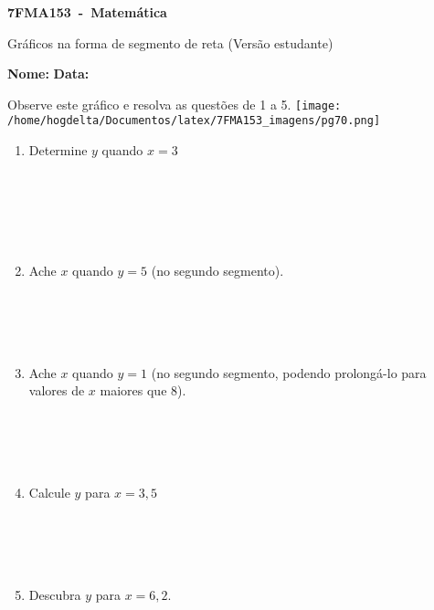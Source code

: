 \documentclass[a4paper,14pt]{article}
\begin{document}
	
	\noindent\textbf{7FMA153~-~Matemática} 
	
	\begin{center}Gráficos na forma de segmento de reta (Versão estudante)
	\end{center}
	
	
	\noindent\textbf{Nome:} \underline{\hspace{10cm}}
    \noindent\textbf{Data:} \underline{\hspace{4cm}}
	
	
	\begin{multicols}{2}
	    Observe este gráfico e resolva as questões de 1 a 5.
	    \texttt{[image: /home/hogdelta/Documentos/latex/7FMA153\_imagens/pg70.png]}
	    \begin{enumerate}
	    	\item Determine $y$ quando $x = 3$ \\\\\\\\\\\\
	    	\item Ache $x$ quando $y = 5$ (no segundo segmento). \\\\\\\\\\
	    	\item Ache $x$ quando $y=1$ (no segundo segmento, podendo prolongá-lo para valores de $x$ maiores que 8). \\\\\\\\\\
	    	\item Calcule $y$ para $x = 3,5$ \\\\\\\\\\
	    	\item Descubra $y$ para $x = 6,2$. \\\\\\\\\\\\\\\\\\

\end{enumerate}
\end{multicols}
\end{document}
